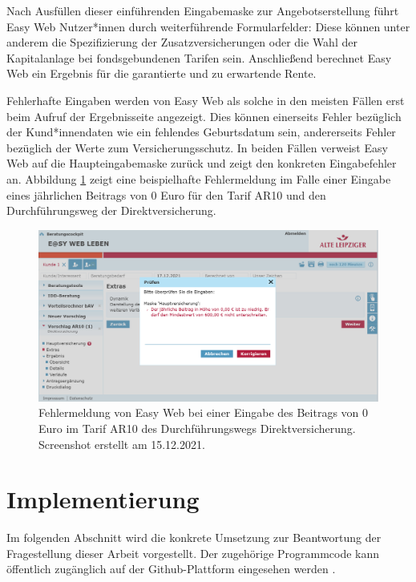 Nach Ausfüllen dieser einführenden Eingabemaske zur Angebotserstellung führt Easy Web Nutzer*innen durch weiterführende Formularfelder: Diese können unter anderem die Spezifizierung der Zusatzversicherungen oder die Wahl der Kapitalanlage bei fondsgebundenen Tarifen sein. Anschließend berechnet Easy Web ein Ergebnis für die garantierte und zu erwartende Rente. 

Fehlerhafte Eingaben werden von Easy Web als solche in den meisten Fällen erst beim Aufruf der Ergebnisseite angezeigt. Dies können einerseits Fehler bezüglich der Kund*innendaten wie ein fehlendes Geburtsdatum sein, andererseits Fehler bezüglich der Werte zum Versicherungsschutz. In beiden Fällen verweist Easy Web auf die Haupteingabemaske zurück und zeigt den konkreten Eingabefehler an. Abbildung \ref{fig:easyWebFehler} zeigt eine beispielhafte Fehlermeldung im Falle einer Eingabe eines jährlichen Beitrags von 0 Euro für den Tarif AR10 und den Durchführungsweg der Direktversicherung.

\begin{figure}[!htb]
\centering
\includegraphics[width=0.8\columnwidth]{images/Easy_Web_Fehler.png}
\caption{Fehlermeldung von Easy Web bei einer Eingabe des Beitrags von 0 Euro im Tarif AR10 des Durchführungswegs Direktversicherung. Screenshot erstellt am 15.12.2021.}
\label{fig:easyWebFehler}
\end{figure}

\section{Implementierung}\label{sec:implementierung}

Im folgenden Abschnitt wird die konkrete Umsetzung zur Beantwortung der Fragestellung dieser Arbeit vorgestellt. Der zugehörige Programmcode kann öffentlich zugänglich auf der Github-Plattform eingesehen werden \cite{github}.

